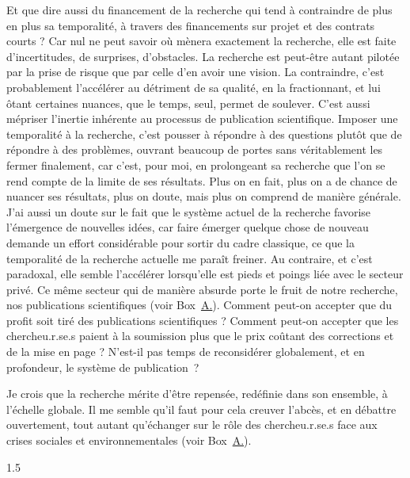 Et que dire aussi du financement de la recherche qui tend à contraindre de plus en plus sa temporalité, à travers des financements sur projet et des contrats courts ? Car nul ne peut savoir où mènera exactement la recherche, elle est faite d'incertitudes, de surprises, d'obstacles. La recherche est peut-être autant pilotée par la prise de risque que par celle d'en avoir une vision. La contraindre, c'est probablement l'accélérer au détriment de sa qualité, en la fractionnant, et lui ôtant certaines nuances, que le temps, seul, permet de soulever. C'est aussi mépriser l'inertie inhérente au processus de publication scientifique. Imposer une temporalité à la recherche, c'est pousser à répondre à des questions plutôt que de répondre à des problèmes, ouvrant beaucoup de portes sans véritablement les fermer finalement, car c'est, pour moi, en prolongeant sa recherche que l'on se rend compte de la limite de ses résultats. Plus on en fait, plus on a de chance de nuancer ses résultats, plus on doute, mais plus on comprend de manière générale. J'ai aussi un doute sur le fait que le système actuel de la recherche favorise l'émergence de nouvelles idées, car faire émerger quelque chose de nouveau demande un effort considérable pour sortir du cadre classique, ce que la temporalité de la recherche actuelle me paraît freiner. Au contraire, et c'est paradoxal, elle semble l'accélérer lorsqu'elle est pieds et poings liée avec le secteur privé. Ce même secteur qui de manière absurde porte le fruit de notre recherche, nos publications scientifiques (voir Box~\hyperref[box:Publication]{\uppercase\expandafter{A\relax}.\thePublication{}}). Comment peut-on accepter que du profit soit tiré des publications scientifiques ? Comment peut-on accepter que les chercheu.r.se.s paient à la soumission plus que le prix coûtant des corrections et de la mise en page ? N'est-il pas temps de reconsidérer globalement, et en profondeur, le système de publication~?

Je crois que la recherche mérite d'être repensée, redéfinie dans son ensemble, à l'échelle globale. Il me semble qu'il faut pour cela creuver l'abcès, et en débattre ouvertement, tout autant qu'échanger sur le rôle des chercheu.r.se.s face aux crises sociales et environnementales (voir Box~\hyperref[box:Conferences]{\uppercase\expandafter{A\relax}.\theConferences{}}).



\begin{spacing}{1.5}
~
\end{spacing}

